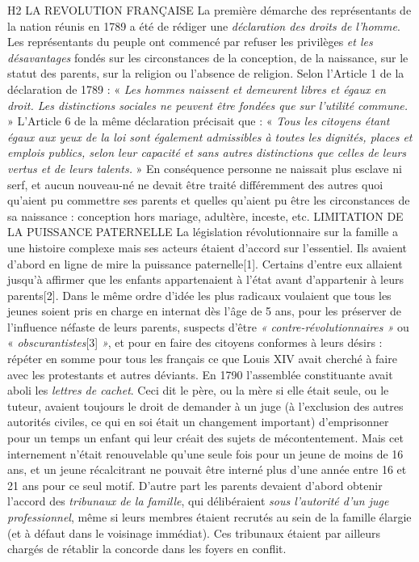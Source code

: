 H2 LA REVOLUTION FRANÇAISE
 La première démarche des représentants de la nation réunis en 1789 a été de rédiger une \emph{déclaration des droits de l'homme}. Les représentants du peuple ont commencé par refuser les privilèges \emph{et les désavantages} fondés sur les circonstances de la conception, de la naissance, sur le statut des parents, sur la religion ou l'absence de religion. Selon l'Article 1 de la déclaration de 1789 : « \emph{Les hommes naissent et demeurent libres et égaux en droit. Les distinctions sociales ne peuvent être fondées que sur l'utilité commune.} » L'Article 6 de la même déclaration précisait que : « \emph{Tous les citoyens étant égaux aux yeux de la loi sont également admissibles à toutes les dignités, places et emplois publics, selon leur capacité et sans autres distinctions que celles de leurs vertus et de leurs talents.} » En conséquence personne ne naissait plus esclave ni serf, et aucun nouveau-né ne devait être traité différemment des autres quoi qu'aient pu commettre ses parents et quelles qu'aient pu être les circonstances de sa naissance : conception hors mariage, adultère, inceste, etc. 
LIMITATION DE LA PUISSANCE PATERNELLE
 La législation révolutionnaire sur la famille a une histoire complexe mais ses acteurs étaient d'accord sur l'essentiel. Ils avaient d'abord en ligne de mire la puissance paternelle[1]. Certains d'entre eux allaient jusqu'à affirmer que les enfants appartenaient à l'état avant d'appartenir à leurs parents[2]. Dans le même ordre d'idée les plus radicaux voulaient que tous les jeunes soient pris en charge en internat dès l'âge de 5 ans, pour les préserver de l'influence néfaste de leurs parents, suspects d'être\emph{ « contre-révolutionnaires »} ou « \emph{obscurantistes}[3]\emph{ »}, et pour en faire des citoyens conformes à leurs désirs : répéter en somme pour tous les français ce que Louis XIV avait cherché à faire avec les protestants et autres déviants.
 En 1790 l'assemblée constituante avait aboli les \emph{lettres de cachet}. Ceci dit le père, ou la mère si elle était seule, ou le tuteur, avaient toujours le droit de demander à un juge (à l'exclusion des autres autorités civiles, ce qui en soi était un changement important) d'emprisonner pour un temps un enfant qui leur créait des sujets de mécontentement. Mais cet internement n'était renouvelable qu'une seule fois pour un jeune de moins de 16 ans, et un jeune récalcitrant ne pouvait être interné plus d'une année entre 16 et 21 ans pour ce seul motif. D'autre part les parents devaient d'abord obtenir l'accord des \emph{tribunaux de la famille}, qui délibéraient \emph{sous l'autorité d'un juge professionnel}, même si leurs membres étaient recrutés au sein de la famille élargie (et à défaut dans le voisinage immédiat). Ces tribunaux étaient par ailleurs chargés de rétablir la concorde dans les foyers en conflit. 
